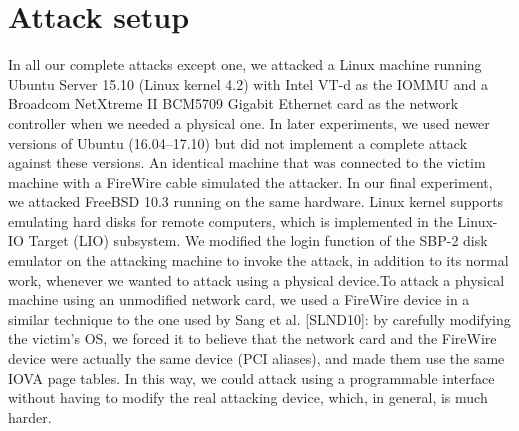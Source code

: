\section{Attack setup}
In all our complete attacks except one, we attacked a Linux machine running Ubuntu Server 15.10 (Linux kernel 4.2) with Intel VT-d as the IOMMU and a Broadcom NetXtreme II BCM5709 Gigabit Ethernet card as the network controller when we needed a physical one. In later experiments, we used newer versions of Ubuntu (16.04–17.10) but did not implement a complete attack against these versions. An identical machine that was connected to the victim machine with a FireWire cable simulated the attacker. In our final experiment, we attacked FreeBSD 10.3 running on the same hardware.  Linux kernel supports emulating hard disks for remote computers, which is implemented in the Linux-IO Target (LIO) subsystem. We modified the login function of the SBP-2 disk emulator on the attacking machine to invoke the attack, in addition to its normal work, whenever we wanted to attack using a physical device.To attack a physical machine using an unmodified network card, we used a FireWire device in a similar technique to the one used by Sang et al. [SLND10]: by carefully modifying the victim’s OS, we forced it to believe that the network card and the FireWire device were actually the same device (PCI aliases), and made them use the same IOVA page tables. In this way, we could attack using a programmable interface without having to modify the real attacking device, which, in general, is much harder.
